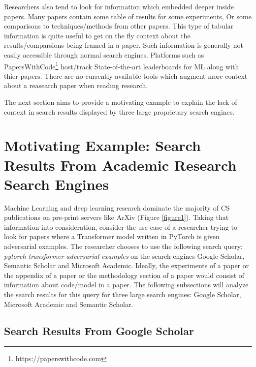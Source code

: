 Researchers also tend to look for information which embedded deeper inside papers. Many papers contain some table of results for some experiments, Or some comparisons to techniques/methods from other papers. This type of tabular information is quite useful to get on the fly context about the results/comparsions being framed in a paper. Such information is generally not easily accessible through normal search engines. Platforms such as PapersWithCode\footnote{https://paperswithcode.com} host/track State-of-the-art leaderboards for ML along with thier papers. There are no currently available tools which augment  more context about a reasearch paper when reading research. 


The next section aims to provide a motivating example to explain the lack of context in search results displayed by three large proprietary search engines.

\section{Motivating Example: Search Results From Academic Research Search Engines}
Machine Learning and deep learning research dominate the majority of CS publications on pre-print servers like ArXiv (Figure \ref{figure1}).
Taking that information into consideration, consider the use-case of a researcher trying to look for papers where a Transformer\parencite{vaswani2017attention} model written in PyTorch\parencite{paszke2019pytorch} is given adversarial examples. 
The researcher chooses to use the following search query: \textit{pytorch transformer adversarial examples} on the search engines Google Scholar, Semantic Scholar and Microsoft Academic. 
Ideally, the experiments of a paper or the appendix of a paper or the methodology section of a paper would consist of information about code/model in a paper. 
The following subsections will analyze the search results for this query for three large search engines: Google Scholar, Microsoft Academic and Semantic Scholar. 
\pagebreak
\subsection{Search Results From Google Scholar}
\label{sr-g}

